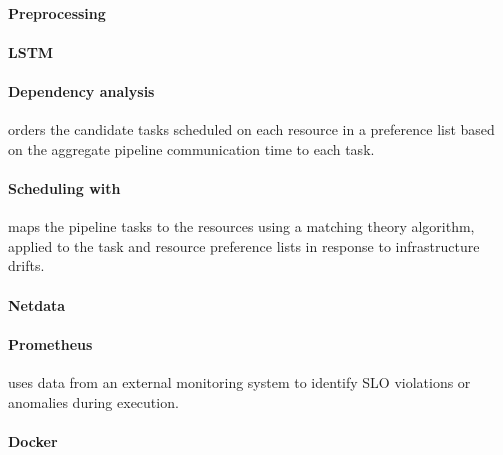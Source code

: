   \paragraph{Preprocessing}

  \paragraph{LSTM}

  \paragraph{Dependency analysis} orders the candidate tasks scheduled on each resource in a preference list based on the aggregate pipeline communication time to each task.
  
  
  \paragraph{Scheduling with \CMATCH } maps the pipeline tasks to the resources using a matching theory algorithm, applied to the task and resource preference lists in response to infrastructure drifts.
  
  
  
  \paragraph{Netdata}

  \paragraph{Prometheus} uses data from an external monitoring system to identify SLO violations or anomalies during execution.



  \paragraph{Docker}



